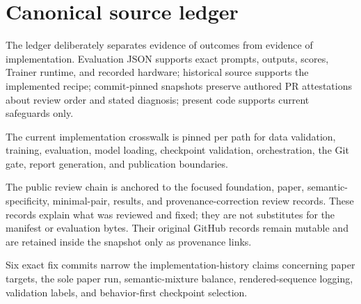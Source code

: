 \section{Canonical source ledger}
\label{app:source-ledger}

The ledger deliberately separates evidence of outcomes from evidence of
implementation.  Evaluation JSON supports exact prompts, outputs, scores,
Trainer runtime, and recorded hardware; historical source supports the
implemented recipe; commit-pinned snapshots preserve authored PR attestations
about review order and stated diagnosis; present code supports current
safeguards only.

The current implementation crosswalk is pinned per path for data validation,
training, evaluation, model loading, checkpoint validation, orchestration, the
Git gate, report generation, and publication boundaries.

The public review chain is anchored to the focused foundation, paper,
semantic-specificity, minimal-pair, results, and provenance-correction review
records.  These records explain what was reviewed and fixed; they are not
substitutes for the manifest or evaluation bytes. Their original GitHub records
remain mutable and are retained inside the snapshot only as provenance links.

Six exact fix commits narrow the implementation-history claims concerning
paper targets, the sole paper run, semantic-mixture balance, rendered-sequence
logging, validation labels, and behavior-first checkpoint selection.

